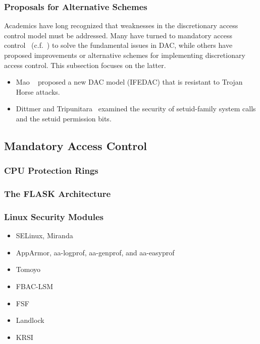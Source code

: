 \subsubsection*{Proposals for Alternative Schemes}

Academics have long recognized that weaknesses in the discretionary access control model
must be addressed. Many have turned to mandatory access control~
(c.f.~) to solve the fundamental issues in DAC, while others have proposed
improvements or alternative schemes for implementing discretionary access control. This
subsection focuses on the latter.

\begin{inprogress}
  \begin{itemize}
    \item Mao \etal~\cite{mao2009_trojan_resistant_dac} proposed a new DAC model (IFEDAC) that is
    resistant to Trojan Horse attacks.
    \item Dittmer and Tripunitara~\cite{dittmer2014_setuid} examined the security of
    setuid-family system calls and the setuid permission bits.
  \end{itemize}
\end{inprogress}




\subsection{Mandatory Access Control}%
\label{ss:mac}

\subsubsection*{CPU Protection Rings}

\subsubsection*{The FLASK Architecture}

\subsubsection*{Linux Security Modules}

\begin{inprogress}
  \begin{itemize}
    \item SELinux, Miranda
    \item AppArmor, aa-logprof, aa-genprof, and aa-easyprof
    \item Tomoyo
    \item FBAC-LSM
    \item FSF~\cite{hu2013_fsf}
    \item Landlock
    \item KRSI
  \end{itemize}
\end{inprogress}




